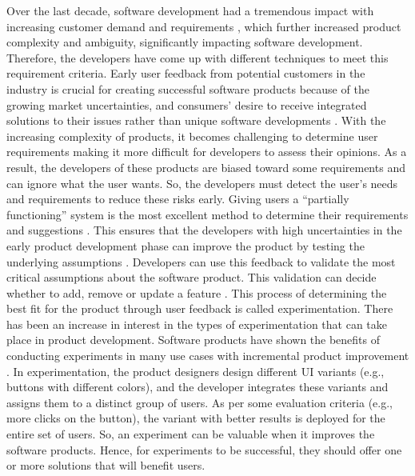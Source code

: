 Over the last decade, software development had a tremendous impact with increasing customer demand and requirements \cite{article:swdemand:ahmed}, which further increased product complexity and ambiguity, significantly impacting software development.  
Therefore, the developers have come up with different techniques to meet this requirement criteria.
Early user feedback from potential customers in the industry is crucial for creating successful software products because of the growing market uncertainties, and consumers' desire to receive integrated solutions to their issues rather than unique software developments \cite{misc:businessmodels:teece}.
With the increasing complexity of products, it becomes challenging to determine user requirements making it more difficult for developers to assess their opinions.
As a result, the developers of these products are biased toward some requirements and can ignore what the user wants. 
So, the developers must detect the user's needs and requirements to reduce these risks early.
Giving users a ``partially functioning'' system is the most excellent method to determine their requirements and suggestions \cite{journal:prototyping:davis}.
This ensures that the developers with high uncertainties in the early product development phase can improve the product by testing the underlying assumptions \cite{misc:lean:steve}.
Developers can use this feedback to validate the most critical assumptions about the software product. 
This validation can decide whether to add, remove or update a feature \cite{article:experiments:lindgren}. 
This process of determining the best fit for the product through user feedback is called experimentation.
There has been an increase in interest in the types of experimentation that can take place in product development. 
Software products have shown the benefits of conducting experiments in many use cases with incremental product improvement \cite{article:controlled:experiements}.
In experimentation, the product designers design different UI variants (e.g., buttons with different colors), and the developer integrates these variants and assigns them to a distinct group of users. 
As per some evaluation criteria (e.g., more clicks on the button), the variant with better results is deployed for the entire set of users.
So, an experiment can be valuable when it improves the software products.
Hence, for experiments to be successful, they should offer one or more solutions that will benefit users.

